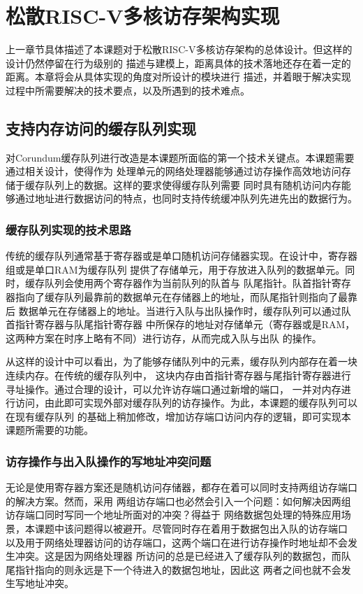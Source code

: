 \section{松散RISC-V多核访存架构实现}

上一章节具体描述了本课题对于松散RISC-V多核访存架构的总体设计。但这样的设计仍然停留在行为级别的
描述与建模上，距离具体的技术落地还存在着一定的距离。本章将会从具体实现的角度对所设计的模块进行
描述，并着眼于解决实现过程中所需要解决的技术要点，以及所遇到的技术难点。

\subsection{支持内存访问的缓存队列实现}

对Corundum缓存队列进行改造是本课题所面临的第一个技术关键点。本课题需要通过相关设计，使得作为
处理单元的网络处理器能够通过访存操作高效地访问存储于缓存队列上的数据。这样的要求使得缓存队列需要
同时具有随机访问内存能够通过地址进行数据访问的特点，也同时支持传统缓冲队列先进先出的数据行为。

\subsubsection{缓存队列实现的技术思路}

传统的缓存队列通常基于寄存器或是单口随机访问存储器实现。在设计中，寄存器组或是单口RAM为缓存队列
提供了存储单元，用于存放进入队列的数据单元。同时，缓存队列会使用两个寄存器作为当前队列的队首与
队尾指针。队首指针寄存器指向了缓存队列最靠前的数据单元在存储器上的地址，而队尾指针则指向了最靠后
数据单元在存储器上的地址。当进行入队与出队操作时，缓存队列可以通过队首指针寄存器与队尾指针寄存器
中所保存的地址对存储单元（寄存器或是RAM，这两种方案在时序上略有不同）进行访存，从而完成入队与出队
的操作。

从这样的设计中可以看出，为了能够存储队列中的元素，缓存队列内部存在着一块连续内存。在传统的缓存队列中，
这块内存由首指针寄存器与尾指针寄存器进行寻址操作。通过合理的设计，可以允许访存端口通过新增的端口，
一并对内存进行访问，由此即可实现外部对缓存队列的访存操作。为此，本课题的缓存队列可以在现有缓存队列
的基础上稍加修改，增加访存端口访问内存的逻辑，即可实现本课题所需要的功能。

\subsubsection{访存操作与出入队操作的写地址冲突问题}

无论是使用寄存器方案还是随机访问存储器，都存在着可以同时支持两组访存端口的解决方案。然而，采用
两组访存端口也必然会引入一个问题：如何解决因两组访存端口同时写同一个地址所面对的冲突？得益于
网络数据包处理的特殊应用场景，本课题中该问题得以被避开。尽管同时存在着用于数据包出入队的访存端口
以及用于网络处理器访问的访存端口，这两个端口在进行访存操作时地址却不会发生冲突。这是因为网络处理器
所访问的总是已经进入了缓存队列的数据包，而队尾指针指向的则永远是下一个待进入的数据包地址，因此这
两者之间也就不会发生写地址冲突。

